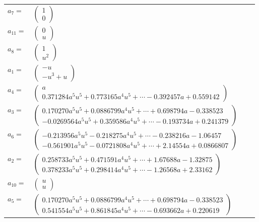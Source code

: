 \documentclass[1p]{elsarticle_modified}
\theoremstyle{definition}
\begin{document}
\begin{tabular}{m{7pt} m{180pt} m{7pt} m{180pt} }
\flushright $a_{7}=$&$\begin{pmatrix}1\\0\end{pmatrix}$ \\
\flushright $a_{11}=$&$\begin{pmatrix}0\\u\end{pmatrix}$ \\
\flushright $a_{8}=$&$\begin{pmatrix}1\\u^2\end{pmatrix}$ \\
\flushright $a_{1}=$&$\begin{pmatrix}- u\\- u^3+u\end{pmatrix}$ \\
\flushright $a_{4}=$&$\begin{pmatrix}a\\0.371284 a^{5} u^{5}+0.773165 a^{4} u^{5}+\cdots-0.392457 a+0.559142\end{pmatrix}$ \\
\flushright $a_{3}=$&$\begin{pmatrix}0.170270 a^{5} u^{5}+0.0886799 a^{4} u^{5}+\cdots+0.698794 a-0.338523\\-0.0269564 a^{5} u^{5}+0.359586 a^{4} u^{5}+\cdots-0.193734 a+0.241379\end{pmatrix}$ \\
\flushright $a_{6}=$&$\begin{pmatrix}-0.213956 a^{5} u^{5}-0.218275 a^{4} u^{5}+\cdots-0.238216 a-1.06457\\-0.561901 a^{5} u^{5}-0.0721808 a^{4} u^{5}+\cdots+2.14554 a+0.0866807\end{pmatrix}$ \\
\flushright $a_{2}=$&$\begin{pmatrix}0.258733 a^{5} u^{5}+0.471591 a^{4} u^{5}+\cdots+1.67688 a-1.32875\\0.378233 a^{5} u^{5}+0.298414 a^{4} u^{5}+\cdots-1.26568 a+2.33162\end{pmatrix}$ \\
\flushright $a_{10}=$&$\begin{pmatrix}u\\u\end{pmatrix}$ \\
\flushright $a_{5}=$&$\begin{pmatrix}0.170270 a^{5} u^{5}+0.0886799 a^{4} u^{5}+\cdots+0.698794 a-0.338523\\0.541554 a^{5} u^{5}+0.861845 a^{4} u^{5}+\cdots-0.693662 a+0.220619\end{pmatrix}$ \\

\end{tabular}
\end{document}
